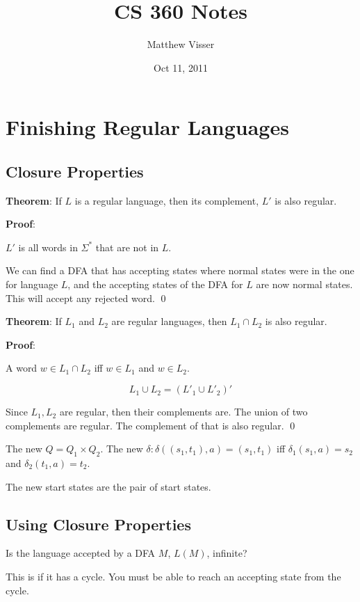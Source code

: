 \documentclass[12pt]{article}
\begin{document}
\title{CS 360 Notes}
\author{Matthew Visser}
\date{Oct 11, 2011}
\maketitle

\section{Finishing Regular Languages}

\subsection{Closure Properties}

\textbf{Theorem}: If $L$ is a regular language, then its complement, $L'$ is
also regular.

\textbf{Proof}:

$L'$ is all words in $\Sigma^*$ that are not in $L$.

We can find a DFA that has accepting states where normal states were in the one
for language $L$, and the accepting states of the DFA for $L$ are now normal
states.  This will accept any rejected word. \qed

\textbf{Theorem}: If $L_1$ and $L_2$ are regular languages, then $L_1 \cap L_2 $
is also regular.

\textbf{Proof}:

A word $w \in L_1 \cap L_2 $ iff $w \in L_1$ and $w \in L_2$.

\begin{equation}
	L_1 \cup L_2 = (L'_1 \cup L'_2)'
\end{equation}

Since $L_1, L_2$ are regular, then their complements are. The union of two
complements are regular. The complement of that is also regular. \qed

The new $Q = Q_1 \times Q_2$. The new $\delta: \delta( (s_1,t_1),a) = (s_1,t_1)$
iff $\delta_1(s_1,a) = s_2$ and $\delta_2(t_1,a) = t_2$.

The new start states are the pair of start states.

\subsection{Using Closure Properties}

Is the language accepted by a DFA $M$, $L(M)$, infinite?

This is if it has a cycle. You must be able to reach an accepting state from the
cycle.
\end{document}
